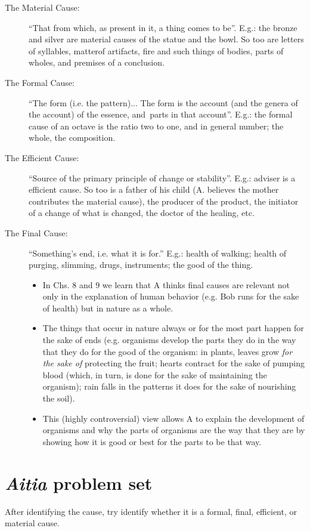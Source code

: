 \documentclass[oneside]{article}
\begin{document}
\begin{description}
\item[The Material Cause:] ``That from which, as present in it, a thing comes to be''. E.g.: the bronze and silver are material causes of the statue and the bowl. So too are letters of syllables, matterof artifacts, fire and such things of bodies, parts of wholes, and premises of a conclusion.
\item[The Formal Cause:] ``The form (i.e. the pattern)... The form is the account (and the genera of the account) of the essence, and\ parts in that account''. E.g.: the  formal cause of an octave is the ratio two to one, and in general number; the whole, the composition.
\item[The Efficient Cause:] ``Source of the primary principle of change or stability''. E.g.: adviser is a efficient cause. So too is a father of his child (A. believes the mother contributes the material cause), the producer of the product, the initiator of a change of what is changed, the doctor of the healing, etc.

\item [The Final Cause:] ``Something's end, i.e. what it is for.'' E.g.: health of walking; health of purging, slimming, drugs, instruments; the good of the thing.
\begin{itemize}
\item  In Chs. 8 and 9 we learn that A thinks final causes are relevant not only in the explanation of human behavior (e.g. Bob runs for the sake of health) but in nature as a whole.
\item The things that occur in nature always or for the most part happen for the sake of ends (e.g. organisms develop the parts they do in the way that they do for the good of the organism: in plants, leaves grow \emph{for the sake of} protecting the fruit; hearts contract for the sake of pumping blood (which, in turn, is done for the sake of maintaining the organism); rain falls in the patterns it does for the sake of nourishing the soil).
\item This (highly controversial) view allows A to explain the development of organisms and why the parts of organisms are the way that they are by showing how it is good or best for the parts to be that way.
\end{itemize}
\end{description}


\section*{\emph{Aitia} problem set}
After identifying the cause, try identify whether it is a formal, final, efficient, or material cause. \vspace*{3mm}
\end{document}
